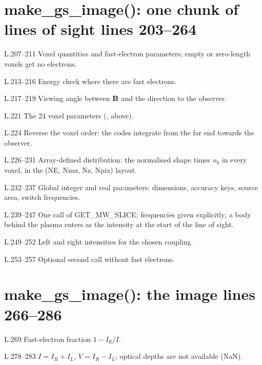 \section*{\normalsize make\_gs\_image(): one chunk of lines of sight \hfill{\small\mdseries\color{gray}lines 203--264}}

\begin{lines}
\item[L.207–211] Voxel quantities and fast-electron parameters; empty or zero-length voxels get no electrons.
\item[L.213–216] Energy check where there are fast electrons.
\item[L.217–219] Viewing angle between $\mathbf{B}$ and the direction to the observer.
\item[L.221] The 24 voxel parameters (, above).
\item[L.224] Reverse the voxel order: the codes integrate from the far end towards the observer.
\item[L.226–231] Array-defined distribution: the normalised shape times $n_b$ in every voxel, in the (NE, Nmu, Nz, Npix) layout.
\item[L.232–237] Global integer and real parameters: dimensions, accuracy keys, source area, switch frequencies.
\item[L.239–247] One call of GET\_MW\_SLICE; frequencies given explicitly; a body behind the plasma enters as the intensity at the start of the line of sight.
\item[L.249–252] Left and right intensities for the chosen coupling.
\item[L.253–257] Optional second call without fast electrons.
\end{lines}
\section*{\normalsize make\_gs\_image(): the image \hfill{\small\mdseries\color{gray}lines 266--286}}

\begin{lines}
\item[L.269] Fast-electron fraction $1-I_\text{ff}/I$.
\item[L.278–283] $I=I_R+I_L$, $V=I_R-I_L$; optical depths are not available (NaN).
\end{lines}

